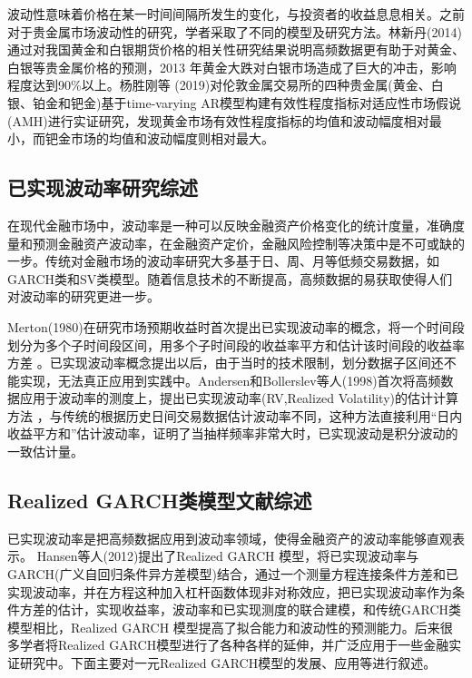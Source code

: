 \documentclass[UTF8,a4paper,12pt]{ctexart}  %
\begin{document}
波动性意味着价格在某一时间间隔所发生的变化，与投资者的收益息息相关。之前对于贵金属市场波动性的研究，学者采取了不同的模型及研究方法。林新丹(2014)通过对我国黄金和白银期货价格的相关性研究结果说明高频数据更有助于对黄金、白银等贵金属价格的预测，2013
年黄金大跌对白银市场造成了巨大的冲击，影响程度达到90\%以上\citep{林新丹2014}。杨胜刚等
(2019)对伦敦金属交易所的四种贵金属(黄金、白银、铂金和钯金)基于time-varying AR模型构建有效性程度指标对适应性市场假说(AMH)进行实证研究，发现黄金市场有效性程度指标的均值和波动幅度相对最小，而钯金市场的均值和波动幅度则相对最大\citep{杨胜刚2019}。

\hypertarget{section-3}{%
\subsection{已实现波动率研究综述}\label{section-3}}

在现代金融市场中，波动率是一种可以反映金融资产价格变化的统计度量，准确度量和预测金融资产波动率，在金融资产定价，金融风险控制等决策中是不可或缺的一步。传统对金融市场的波动率研究大多基于日、周、月等低频交易数据，如GARCH类和SV类模型。随着信息技术的不断提高，高频数据的易获取使得人们对波动率的研究更进一步。

Merton(1980)在研究市场预期收益时首次提出已实现波动率的概念，将一个时间段划分为多个子时间段区间，用多个子时间段的收益率平方和估计该时间段的收益率方差
\citep{MertonRobert1980}。已实现波动率概念提出以后，由于当时的技术限制，划分数据子区间还不能实现，无法真正应用到实践中。Andersen和Bollerslev等人(1998)首次将高频数据应用于波动率的测度上，提出已实现波动率(RV,Realized Volatility)的估计计算方法
\citep{TimBollerslev}，与传统的根据历史日间交易数据估计波动率不同，这种方法直接利用``日内收益平方和''估计波动率，证明了当抽样频率非常大时，已实现波动是积分波动的一致估计量。

\hypertarget{realized-garch}{%
\subsection{Realized GARCH类模型文献综述}\label{realized-garch}}

已实现波动率是把高频数据应用到波动率领域，使得金融资产的波动率能够直观表示。
Hansen等人(2012)提出了Realized GARCH 模型，将已实现波动率与GARCH(广义自回归条件异方差模型)结合，通过一个测量方程连接条件方差和已实现波动率，并在方程这种加入杠杆函数体现非对称效应，把已实现波动率作为条件方差的估计，实现收益率，波动率和已实现测度的联合建模，和传统GARCH类模型相比，Realized GARCH 模型提高了拟合能力和波动性的预测能力\citep{Hansen2012}。后来很多学者将Realized GARCH模型进行了各种各样的延伸，并广泛应用于一些金融实证研究中。下面主要对一元Realized GARCH模型的发展、应用等进行叙述。
\end{document}

